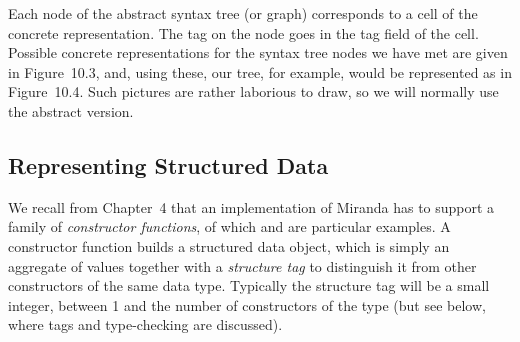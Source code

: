Each node of the abstract syntax tree (or graph) corresponds to a cell of the
concrete representation. The tag on the node goes in the tag field of the cell.
Possible concrete representations for the syntax tree nodes we have met are
given in Figure~10.3, and, using these, our  tree, for example, would
be represented as in Figure~10.4. Such pictures are rather laborious to draw,
so we will normally use the abstract version.

\subsection{Representing Structured Data}

We recall from Chapter~4 that an implementation of Miranda has to support a
family of \textit{constructor functions}, of which  and  are particular
examples. A constructor function builds a structured data object, which is
simply an aggregate of values together with a \textit{structure tag} to distinguish it
from other constructors of the same data type. Typically the structure tag will
be a small integer, between 1 and the number of constructors of the type (but
see below, where tags and type-checking are discussed).

